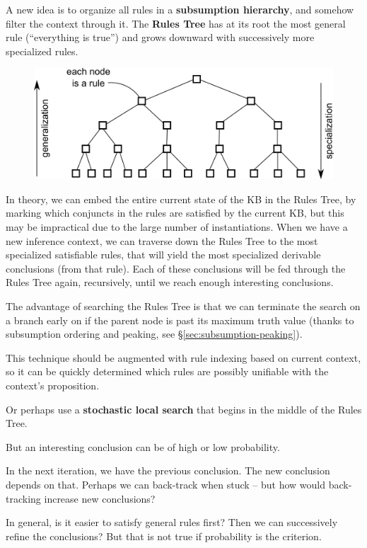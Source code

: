 A new idea is to organize all rules in a \textbf{subsumption hierarchy}, and somehow filter the context through it.  The \textbf{Rules Tree} has at its root the most general rule (``everything is true'') and grows downward with successively more specialized rules.
\begin{figure}[H]
\centering
\includegraphics[scale=1]{rules-tree.png}
\end{figure}
  
In theory, we can embed the entire current state of the KB in the Rules Tree, by marking which conjuncts in the rules are satisfied by the current KB, but this may be impractical due to the large number of instantiations.  When we have a new inference context, we can traverse down the Rules Tree to the most specialized satisfiable rules, that will yield the most specialized derivable conclusions (from that rule).  Each of these conclusions will be fed through the Rules Tree again, recursively, until we reach enough interesting conclusions.  

The advantage of searching the Rules Tree is that we can terminate the search on a branch early on if the parent node is past its maximum truth value (thanks to subsumption ordering and peaking, see \S\ref{sec:subsumption-peaking}).

This technique should be augmented with rule indexing based on current context, so it can be quickly determined which rules are possibly unifiable with the context's proposition.

Or perhaps use a \textbf{stochastic local search} that begins in the middle of the Rules Tree.

But an interesting conclusion can be of high or low probability.

In the next iteration, we have the previous conclusion.  The new conclusion depends on that.  Perhaps we can back-track when stuck -- but how would back-tracking increase new conclusions?

In general, is it easier to satisfy general rules first?  Then we can successively refine the conclusions?  But that is not true if probability is the criterion.

